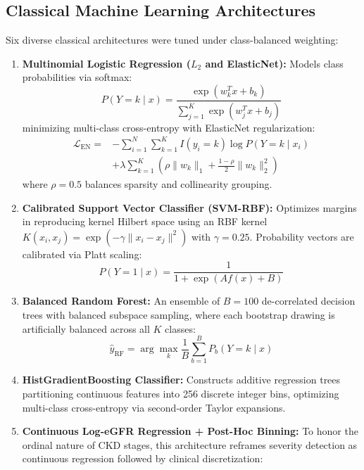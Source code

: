 \documentclass[conference]{IEEEtran}
\begin{document}
\subsection{Classical Machine Learning Architectures}
Six diverse classical architectures were tuned under class-balanced weighting:
\begin{enumerate}
    \item \textbf{Multinomial Logistic Regression ($L_2$ and ElasticNet):} Models class probabilities via softmax:
    \begin{equation}
    P(Y = k \mid x) = \frac{\exp(w_k^T x + b_k)}{\sum_{j=1}^K \exp(w_j^T x + b_j)}
    \end{equation}
    minimizing multi-class cross-entropy with ElasticNet regularization:
    \begin{equation}
    \begin{split}
    \mathcal{L}_{\text{EN}} = & -\sum_{i=1}^N \sum_{k=1}^K I(y_i = k) \log P(Y = k \mid x_i) \\
    & + \lambda \sum_{k=1}^K \left( \rho \|w_k\|_1 + \frac{1-\rho}{2} \|w_k\|_2^2 \right)
    \end{split}
    \end{equation}
    where $\rho = 0.5$ balances sparsity and collinearity grouping.
    \item \textbf{Calibrated Support Vector Classifier (SVM-RBF):} Optimizes margins in reproducing kernel Hilbert space using an RBF kernel $K(x_i, x_j) = \exp(-\gamma \|x_i - x_j\|^2)$ with $\gamma = 0.25$. Probability vectors are calibrated via Platt scaling:
    \begin{equation}
    P(Y = 1 \mid x) = \frac{1}{1 + \exp(A f(x) + B)}
    \end{equation}
    \item \textbf{Balanced Random Forest:} An ensemble of $B = 100$ de-correlated decision trees with balanced subspace sampling, where each bootstrap drawing is artificially balanced across all $K$ classes:
    \begin{equation}
    \hat{y}_{\text{RF}} = \arg\max_k \frac{1}{B} \sum_{b=1}^B P_b(Y = k \mid x)
    \end{equation}
    \item \textbf{HistGradientBoosting Classifier:} Constructs additive regression trees partitioning continuous features into 256 discrete integer bins, optimizing multi-class cross-entropy via second-order Taylor expansions.
    \item \textbf{Continuous Log-eGFR Regression + Post-Hoc Binning:} To honor the ordinal nature of CKD stages, this architecture reframes severity detection as continuous regression followed by clinical discretization:

\end{enumerate}
\end{document}
